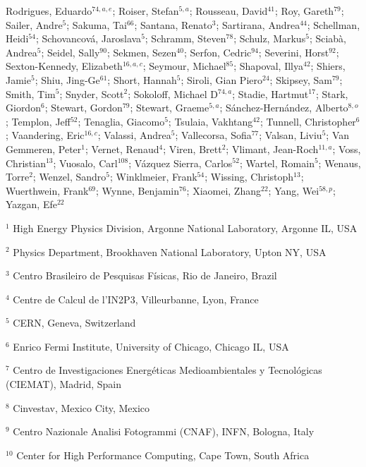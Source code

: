 Rodrigues, Eduardo$^{74,a,e}$;
Roiser, Stefan$^{5,a}$;
Rousseau, David$^{41}$;
Roy, Gareth$^{79}$;
Sailer, Andre$^{5}$;
Sakuma, Tai$^{66}$;
Santana, Renato$^{3}$;
Sartirana, Andrea$^{44}$;
Schellman, Heidi$^{54}$;
Schovancová, Jaroslava$^{5}$;
Schramm, Steven$^{78}$;
Schulz, Markus$^{5}$;
Sciabà, Andrea$^{5}$;
Seidel, Sally$^{90}$;
Sekmen, Sezen$^{40}$;
Serfon, Cedric$^{94}$;
Severini, Horst$^{92}$;
Sexton-Kennedy, Elizabeth$^{16,a,c}$;
Seymour, Michael$^{85}$;
Shapoval, Illya$^{42}$;
Shiers, Jamie$^{5}$;
Shiu, Jing-Ge$^{61}$;
Short, Hannah$^{5}$;
Siroli, Gian Piero$^{24}$;
Skipsey, Sam$^{79}$;
Smith, Tim$^{5}$;
Snyder, Scott$^{2}$;
Sokoloff, Michael D$^{74,a}$;
Stadie, Hartmut$^{17}$;
Stark, Giordon$^{6}$;
Stewart, Gordon$^{79}$;
Stewart, Graeme$^{5,a}$;
Sánchez-Hernández, Alberto$^{8,o}$;
Templon, Jeff$^{52}$;
Tenaglia, Giacomo$^{5}$;
Tsulaia, Vakhtang$^{42}$;
Tunnell, Christopher$^{6}$;
Vaandering, Eric$^{16,c}$;
Valassi, Andrea$^{5}$;
Vallecorsa, Sofia$^{77}$;
Valsan, Liviu$^{5}$;
Van Gemmeren, Peter$^{1}$;
Vernet, Renaud$^{4}$;
Viren, Brett$^{2}$;
Vlimant, Jean-Roch$^{11,a}$;
Voss, Christian$^{13}$;
Vuosalo, Carl$^{108}$;
Vázquez Sierra, Carlos$^{52}$;
Wartel, Romain$^{5}$;
Wenaus, Torre$^{2}$;
Wenzel, Sandro$^{5}$;
Winklmeier, Frank$^{54}$;
Wissing, Christoph$^{13}$;
Wuerthwein, Frank$^{69}$;
Wynne, Benjamin$^{76}$;
Xiaomei, Zhang$^{22}$;
Yang, Wei$^{58,p}$;
Yazgan, Efe$^{22}$
\bigskip
\par {\footnotesize $^{1}$ High Energy Physics Division, Argonne National Laboratory, Argonne IL, USA}
\par {\footnotesize $^{2}$ Physics Department, Brookhaven National Laboratory, Upton NY, USA}
\par {\footnotesize $^{3}$ Centro Brasileiro de Pesquisas Físicas, Rio de Janeiro, Brazil}
\par {\footnotesize $^{4}$ Centre de Calcul de l’IN2P3, Villeurbanne, Lyon, France}
\par {\footnotesize $^{5}$ CERN, Geneva, Switzerland}
\par {\footnotesize $^{6}$ Enrico Fermi Institute, University of Chicago, Chicago IL, USA}
\par {\footnotesize $^{7}$ Centro de Investigaciones Energéticas Medioambientales y Tecnológicas (CIEMAT), Madrid, Spain}
\par {\footnotesize $^{8}$ Cinvestav, Mexico City, Mexico}
\par {\footnotesize $^{9}$ Centro Nazionale Analisi Fotogrammi (CNAF), INFN, Bologna, Italy}
\par {\footnotesize $^{10}$ Center for High Performance Computing, Cape Town, South Africa}
